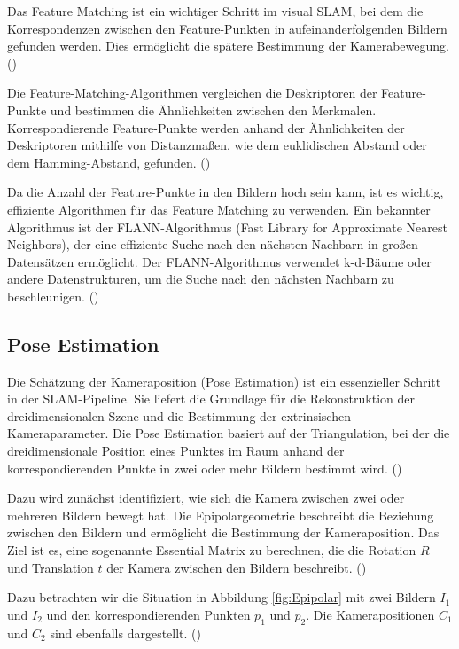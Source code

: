 Das Feature Matching ist ein wichtiger Schritt im visual SLAM, bei dem die Korrespondenzen zwischen den Feature-Punkten in aufeinanderfolgenden Bildern gefunden werden. Dies ermöglicht die spätere Bestimmung der Kamerabewegung. (\cite{gao2021vSLAM, szeliski2022computerVision})

Die Feature-Matching-Algorithmen vergleichen die Deskriptoren der Feature-Punkte und bestimmen die Ähnlichkeiten zwischen den Merkmalen. Korrespondierende Feature-Punkte werden anhand der Ähnlichkeiten der Deskriptoren mithilfe von Distanzmaßen, wie dem euklidischen Abstand oder dem Hamming-Abstand, gefunden. (\cite{gao2021vSLAM, szeliski2022computerVision})

Da die Anzahl der Feature-Punkte in den Bildern hoch sein kann, ist es wichtig, effiziente Algorithmen für das Feature Matching zu verwenden. Ein bekannter Algorithmus ist der FLANN-Algorithmus (Fast Library for Approximate Nearest Neighbors), der eine effiziente Suche nach den nächsten Nachbarn in großen Datensätzen ermöglicht. Der FLANN-Algorithmus verwendet k-d-Bäume oder andere Datenstrukturen, um die Suche nach den nächsten Nachbarn zu beschleunigen. (\cite{gao2021vSLAM, szeliski2022computerVision})

\subsection{Pose Estimation}

Die Schätzung der Kameraposition (Pose Estimation) ist ein essenzieller Schritt in der SLAM-Pipeline. Sie liefert die Grundlage für die Rekonstruktion der dreidimensionalen Szene und die Bestimmung der extrinsischen Kameraparameter. Die Pose Estimation basiert auf der Triangulation, bei der die dreidimensionale Position eines Punktes im Raum anhand der korrespondierenden Punkte in zwei oder mehr Bildern bestimmt wird. (\cite{gao2021vSLAM})

Dazu wird zunächst identifiziert, wie sich die Kamera zwischen zwei oder mehreren Bildern bewegt hat. Die Epipolargeometrie beschreibt die Beziehung zwischen den Bildern und ermöglicht die Bestimmung der Kameraposition.  Das Ziel ist es, eine sogenannte Essential Matrix zu berechnen, die die Rotation \( R \) und Translation \( t \) der Kamera zwischen den Bildern beschreibt. (\cite{gao2021vSLAM})

Dazu betrachten wir die Situation in Abbildung \ref{fig:Epipolar} mit zwei Bildern \( I_1 \) und \( I_2 \) und den korrespondierenden Punkten \( p_1 \) und \( p_2 \). Die Kamerapositionen \( C_1 \) und \( C_2 \) sind ebenfalls dargestellt. (\cite{gao2021vSLAM})

